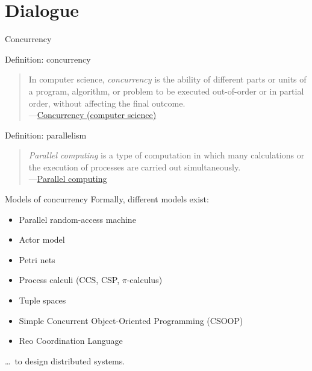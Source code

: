 \documentclass{beamer}
\begin{document}
\section{Dialogue}

\begin{frame}[standout]
  Concurrency
\end{frame}

\begin{frame}[fragile]{Definition: concurrency}
  \begin{quote}
    In computer science, \emph{concurrency} is the ability of different parts or units of a program, algorithm, or problem to be executed out-of-order or in partial order, without affecting the final outcome. \\
    ---\href{https://en.wikipedia.org/w/index.php?title=Concurrency_(computer_science)&oldid=971297468}{Concurrency (computer science)}
  \end{quote}
\end{frame}

\begin{frame}[fragile]{Definition: parallelism}
  \begin{quote}
    \emph{Parallel computing} is a type of computation in which many calculations or the execution of processes are carried out simultaneously. \\
    ---\href{https://en.wikipedia.org/w/index.php?title=Parallel_computing&oldid=961837202}{Parallel computing}
  \end{quote}
\end{frame}

\begin{frame}[fragile]{Models of concurrency}
  Formally, different models exist:
  \begin{itemize}
    \item Parallel random-access machine
    \item Actor model
    \item Petri nets
    \item Process calculi (CCS, CSP, $\pi$-calculus)
    \item Tuple spaces
    \item Simple Concurrent Object-Oriented Programming (CSOOP)
    \item Reo Coordination Language
  \end{itemize}
  \dots\ to design distributed systems.
\end{frame}
\end{document}
